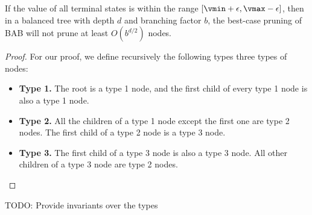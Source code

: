 \begin{theorem}
If the value of all terminal states is within the range $[\vmin+\epsilon, \vmax-\epsilon]$, then in a balanced tree with depth $d$ and branching factor $b$, the best-case pruning of BAB will not prune at least $O(b^{d/2})$ nodes. 
\label{the:best}
\end{theorem}
\begin{proof}
For our proof, we define recursively the following types three types of nodes:

\begin{itemize}
\item \textbf{Type 1.} The root is a type 1 node, and the first child of every type 1 node is also a type 1 node. 
\item \textbf{Type 2.} All the children of a type 1 node except the first one are type 2 nodes. The first child of a type 2 node is a type 3 node. 
\item \textbf{Type 3.} The first child of a type 3 node is also a type 3 node. All other children of a type 3 node are type 2 nodes. 
\end{itemize}
\end{proof}

TODO: Provide invariants over the types





